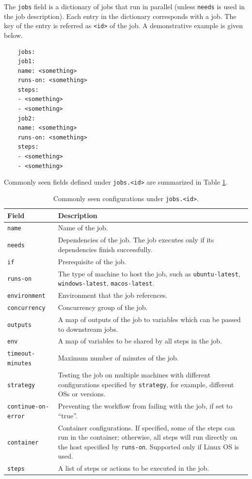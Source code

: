 The \verb|jobs| field is a dictionary of jobs that run in parallel (unless \verb|needs| is used in the job description). Each entry in the dictionary corresponds with a job. The key of the entry is referred as \verb|<id>| of the job. A demonstrative example is given below.
\begin{lstlisting}
	jobs:
	job1:
	name: <something>
	runs-on: <something>
	steps:
	- <something>
	- <something>
	job2:
	name: <something>
	runs-on: <something>
	steps:
	- <something>
	- <something>
\end{lstlisting}
Commonly seen fields defined under \texttt{jobs.<id>} are summarized in Table \ref{tab:githubactions_jobs}.
\begin{table}[!htb]
	\centering \caption{Commonly seen configurations under \texttt{jobs.<id>}.}\label{tab:githubactions_jobs}
	\begin{tabularx}{\textwidth}{lX}
		\hline
		Field & Description \\ \hline
		\texttt{name} & Name of the job. \\
		\texttt{needs} & Dependencies of the job. The job executes only if its dependencies finish successfully.\\
		\texttt{if} & Prerequisite of the job. \\
		\texttt{runs-on} & The type of machine to host the job, such as \texttt{ubuntu-latest}, \texttt{windows-latest}, \texttt{macos-latest}. \\
		\texttt{environment} & Environment that the job references. \\
		\texttt{concurrency} & Concurrency group of the job. \\
		\texttt{outputs} & A map of outputs of the job to variables which can be passed to downstream jobs. \\
		\texttt{env} & A map of variables to be shared by all steps in the job. \\
		\texttt{timeout-minutes} & Maximum number of minutes of the job. \\
		\texttt{strategy} & Testing the job on multiple machines with different configurations specified by \texttt{strategy}, for example, different OSs or versions. \\
		\texttt{continue-on-error} & Preventing the workflow from failing with the job, if set to ``true''. \\
		\texttt{container} & Container configurations. If specified, some of the steps can run in the container; otherwise, all steps will run directly on the host specified by \texttt{runs-on}. Supported only if Linux OS is used. \\
		\texttt{steps} & A list of steps or actions to be executed in the job. \\
		\hline
	\end{tabularx}
\end{table}

